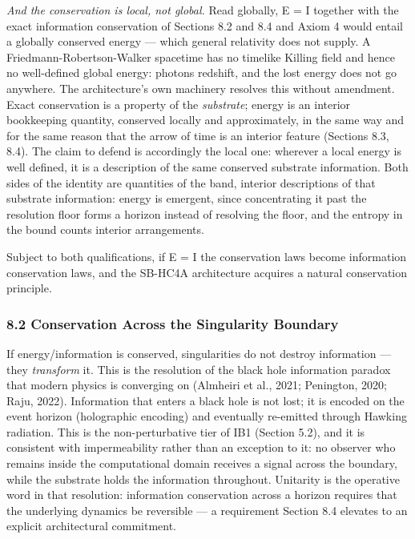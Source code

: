 \documentclass[
]{article}
\begin{document}
\emph{And the conservation is local, not global.} Read globally, E = I
together with the exact information conservation of Sections 8.2 and 8.4
and Axiom 4 would entail a globally conserved energy --- which general
relativity does not supply. A Friedmann-Robertson-Walker spacetime has
no timelike Killing field and hence no well-defined global energy:
photons redshift, and the lost energy does not go anywhere. The
architecture's own machinery resolves this without amendment. Exact
conservation is a property of the \emph{substrate}; energy is an
interior bookkeeping quantity, conserved locally and approximately, in
the same way and for the same reason that the arrow of time is an
interior feature (Sections 8.3, 8.4). The claim to defend is accordingly
the local one: wherever a local energy is well defined, it is a
description of the same conserved substrate information. Both sides of
the identity are quantities of the band, interior descriptions of that
substrate information: energy is emergent, since concentrating it past
the resolution floor forms a horizon instead of resolving the floor, and
the entropy in the bound counts interior arrangements.

Subject to both qualifications, if E = I the conservation laws become
information conservation laws, and the SB-HC4A architecture acquires a
natural conservation principle.

\hypertarget{conservation-across-the-singularity-boundary}{%
\subsubsection{8.2 Conservation Across the Singularity
Boundary}\label{conservation-across-the-singularity-boundary}}

If energy/information is conserved, singularities do not destroy
information --- they \emph{transform} it. This is the resolution of the
black hole information paradox that modern physics is converging on
(Almheiri et al., 2021; Penington, 2020; Raju, 2022). Information that
enters a black hole is not lost; it is encoded on the event horizon
(holographic encoding) and eventually re-emitted through Hawking
radiation. This is the non-perturbative tier of IB1 (Section 5.2), and
it is consistent with impermeability rather than an exception to it: no
observer who remains inside the computational domain receives a signal
across the boundary, while the substrate holds the information
throughout. Unitarity is the operative word in that resolution:
information conservation across a horizon requires that the underlying
dynamics be reversible --- a requirement Section 8.4 elevates to an
explicit architectural commitment.
\end{document}
